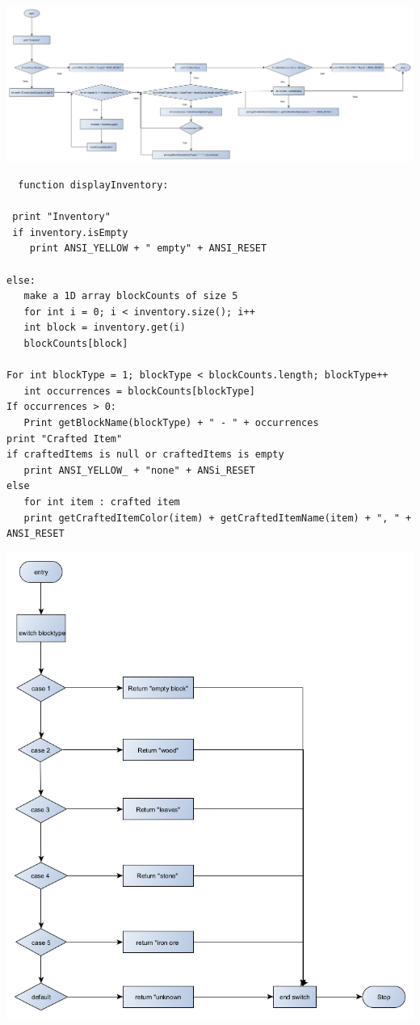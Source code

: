 {\includegraphics[width=\textwidth]{../flowchart/displayInventory.png}}
\begin{lstlisting}
  function displayInventory:

 print "Inventory"
 if inventory.isEmpty
    print ANSI_YELLOW + " empty" + ANSI_RESET 

else:
   make a 1D array blockCounts of size 5 
   for int i = 0; i < inventory.size(); i++
   int block = inventory.get(i) 
   blockCounts[block] 

For int blockType = 1; blockType < blockCounts.length; blockType++ 
   int occurrences = blockCounts[blockType] 
If occurrences > 0: 
   Print getBlockName(blockType) + " - " + occurrences
print "Crafted Item"
if craftedItems is null or craftedItems is empty
   print ANSI_YELLOW_ + "none" + ANSi_RESET
else 
   for int item : crafted item 
   print getCraftedItemColor(item) + getCraftedItemName(item) + ", " + ANSI_RESET

\end{lstlisting}

{\includegraphics[width=\textwidth]{../flowchart/getBlockName.png}}

